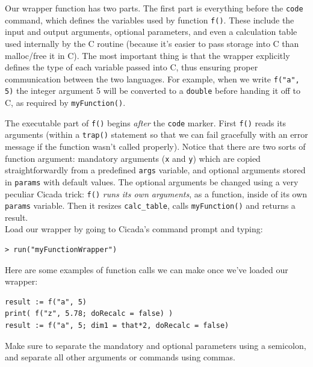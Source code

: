 \documentclass{article}
\newenvironment{code}{
       \begin{list}{}{
               \setlength{\leftmargin}{.4in}
               \setlength{\rightmargin}{0in}
               \setlength{\topsep}{.2in}
       }
       \small
       \item[] }
       { \end{list}   }
\begin{document}
Our wrapper function has two parts.  The first part is everything before the \verb#code# command, which defines the variables used by function \verb#f()#.  These include the input and output arguments, optional parameters, and even a calculation table used internally by the C routine (because it's easier to pass storage into C than malloc/free it in C).  The most important thing is that the wrapper explicitly defines the type of each variable passed into C, thus ensuring proper communication between the two languages.  For example, when we write \verb#f("a", 5)# the integer argument 5 will be converted to a \verb#double# before handing it off to C, as required by \verb#myFunction()#.

The executable part of \verb#f()# begins \emph{after} the \verb#code# marker.  First \verb#f()# reads its arguments (within a \verb#trap()# statement so that we can fail gracefully with an error message if the function wasn't called properly).  Notice that there are two sorts of function argument: mandatory arguments (\verb#x# and \verb#y#) which are copied straightforwardly from a predefined \verb#args# variable, and optional arguments stored in \verb#params# with default values.  The optional arguments be changed using a very peculiar Cicada trick:  \verb#f()# \emph{runs its own arguments}, as a function, inside of its own \verb#params# variable.  Then it resizes \verb#calc_table#, calls \verb#myFunction()# and returns a result.\\

Load our wrapper by going to Cicada's command prompt and typing:

\begin{code} \begin{verbatim}
> run("myFunctionWrapper")
\end{verbatim} \end{code}

\noindent Here are some examples of function calls we can make once we've loaded our wrapper:

\begin{code} \begin{verbatim}
result := f("a", 5)
print( f("z", 5.78; doRecalc = false) )
result := f("a", 5; dim1 = that*2, doRecalc = false)
\end{verbatim} \end{code}

\noindent Make sure to separate the mandatory and optional parameters using a semicolon, and separate all other arguments or commands using commas.\\
\end{document}
